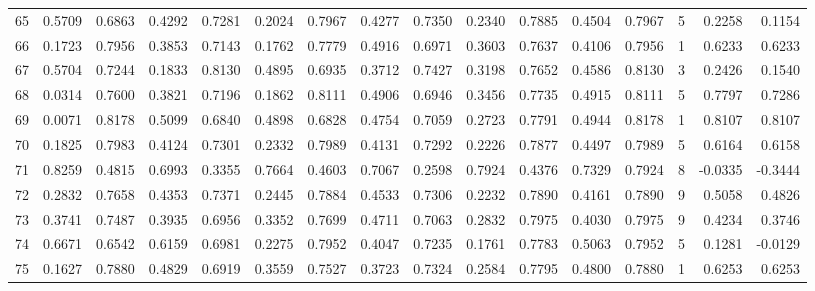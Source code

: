\begin{tabular}{lrrrrrrrrrrrrrrr}
65  &      0.5709 &  0.6863 &  0.4292 &  0.7281 &  0.2024 &  0.7967 &  0.4277 &  0.7350 &  0.2340 &  0.7885 &   0.4504 &     0.7967 &      5 &                    0.2258 &                     0.1154 \\
66  &      0.1723 &  0.7956 &  0.3853 &  0.7143 &  0.1762 &  0.7779 &  0.4916 &  0.6971 &  0.3603 &  0.7637 &   0.4106 &     0.7956 &      1 &                    0.6233 &                     0.6233 \\
67  &      0.5704 &  0.7244 &  0.1833 &  0.8130 &  0.4895 &  0.6935 &  0.3712 &  0.7427 &  0.3198 &  0.7652 &   0.4586 &     0.8130 &      3 &                    0.2426 &                     0.1540 \\
68  &      0.0314 &  0.7600 &  0.3821 &  0.7196 &  0.1862 &  0.8111 &  0.4906 &  0.6946 &  0.3456 &  0.7735 &   0.4915 &     0.8111 &      5 &                    0.7797 &                     0.7286 \\
69  &      0.0071 &  0.8178 &  0.5099 &  0.6840 &  0.4898 &  0.6828 &  0.4754 &  0.7059 &  0.2723 &  0.7791 &   0.4944 &     0.8178 &      1 &                    0.8107 &                     0.8107 \\
70  &      0.1825 &  0.7983 &  0.4124 &  0.7301 &  0.2332 &  0.7989 &  0.4131 &  0.7292 &  0.2226 &  0.7877 &   0.4497 &     0.7989 &      5 &                    0.6164 &                     0.6158 \\
71  &      0.8259 &  0.4815 &  0.6993 &  0.3355 &  0.7664 &  0.4603 &  0.7067 &  0.2598 &  0.7924 &  0.4376 &   0.7329 &     0.7924 &      8 &                   -0.0335 &                    -0.3444 \\
72  &      0.2832 &  0.7658 &  0.4353 &  0.7371 &  0.2445 &  0.7884 &  0.4533 &  0.7306 &  0.2232 &  0.7890 &   0.4161 &     0.7890 &      9 &                    0.5058 &                     0.4826 \\
73  &      0.3741 &  0.7487 &  0.3935 &  0.6956 &  0.3352 &  0.7699 &  0.4711 &  0.7063 &  0.2832 &  0.7975 &   0.4030 &     0.7975 &      9 &                    0.4234 &                     0.3746 \\
74  &      0.6671 &  0.6542 &  0.6159 &  0.6981 &  0.2275 &  0.7952 &  0.4047 &  0.7235 &  0.1761 &  0.7783 &   0.5063 &     0.7952 &      5 &                    0.1281 &                    -0.0129 \\
75  &      0.1627 &  0.7880 &  0.4829 &  0.6919 &  0.3559 &  0.7527 &  0.3723 &  0.7324 &  0.2584 &  0.7795 &   0.4800 &     0.7880 &      1 &                    0.6253 &                     0.6253 \\

\end{tabular}
